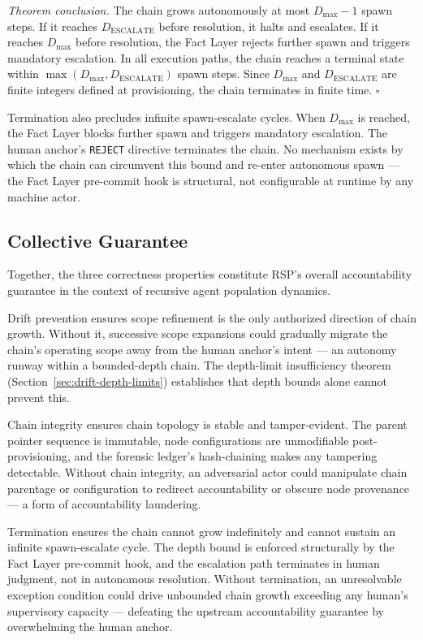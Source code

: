 \medskip
\textit{Theorem conclusion.} The chain grows autonomously at most $D_{\max} - 1$ spawn steps. If it reaches $D_{\mathrm{ESCALATE}}$ before resolution, it halts and escalates. If it reaches $D_{\max}$ before resolution, the Fact Layer rejects further spawn and triggers mandatory escalation. In all execution paths, the chain reaches a terminal state within $\max(D_{\max}, D_{\mathrm{ESCALATE}})$ spawn steps. Since $D_{\max}$ and $D_{\mathrm{ESCALATE}}$ are finite integers defined at provisioning, the chain terminates in finite time. $\square$

Termination also precludes infinite spawn-escalate cycles. When $D_{\max}$ is reached, the Fact Layer blocks further spawn and triggers mandatory escalation. The human anchor's \texttt{REJECT} directive terminates the chain. No mechanism exists by which the chain can circumvent this bound and re-enter autonomous spawn — the Fact Layer pre-commit hook is structural, not configurable at runtime by any machine actor.

\subsection{Collective Guarantee}
\label{sec:rs-collective}

Together, the three correctness properties constitute RSP's overall accountability guarantee in the context of recursive agent population dynamics.

Drift prevention ensures scope refinement is the only authorized direction of chain growth. Without it, successive scope expansions could gradually migrate the chain's operating scope away from the human anchor's intent — an autonomy runway within a bounded-depth chain. The depth-limit insufficiency theorem (Section~\ref{sec:drift-depth-limits}) establishes that depth bounds alone cannot prevent this.

Chain integrity ensures chain topology is stable and tamper-evident. The parent pointer sequence is immutable, node configurations are unmodifiable post-provisioning, and the forensic ledger's hash-chaining makes any tampering detectable. Without chain integrity, an adversarial actor could manipulate chain parentage or configuration to redirect accountability or obscure node provenance — a form of accountability laundering.

Termination ensures the chain cannot grow indefinitely and cannot sustain an infinite spawn-escalate cycle. The depth bound is enforced structurally by the Fact Layer pre-commit hook, and the escalation path terminates in human judgment, not in autonomous resolution. Without termination, an unresolvable exception condition could drive unbounded chain growth exceeding any human's supervisory capacity — defeating the upstream \bxthree accountability guarantee by overwhelming the human anchor.

